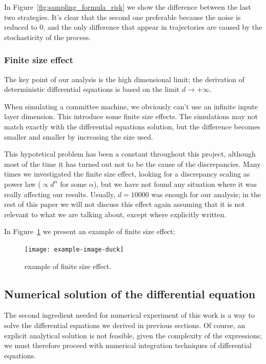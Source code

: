 In Figure~\ref{fig:sampling_formula_risk} we show the difference between the last two strategies.
It's clear that the second one preferable because the noise is reduced to 0, and the only difference
that appear in trajectories are caused by the stochasticity of the process.

\subsubsection{Finite size effect}
The key point of our analysis is the high dimensional limit; the derivation of 
deterministic differential equations is based on the limit \(d\to+\infty\).

When simulating a committee machine, we obviously can't use an infinite inpute layer dimension.
This introduce some finite size effects. The simulations may not match exactly with the 
differential equations solution, but the difference becomes smaller and smaller by 
increasing the size used. 

This hypotetical problem has been a constant throughout this project,
although most of the time it has turned out not to be the cause of the discrepancies.
Many times we investigated the finite size effect, looking for a discrepancy scaling as
power law (\(\propto d^\alpha\) for some \(\alpha\)), but we have not found any situation where
it was really affecting our results. Usually, \(d=10000\) was enough for our analysis; 
in the rest of this paper we will not discuss this effect again assuming that
it is not relevant to what we are talking about, except where explicitly written.

In Figure~\ref{fig:finite_size_example} we present an example of finite size effect;
\begin{figure}
  \begin{center}
    \texttt{[image: example-image-duck]}

    \caption{
      example of finite size effect. 
    }
    \label{fig:finite_size_example}
  \end{center}
\end{figure}

\subsection{Numerical solution of the differential equation}
The second ingredient needed for numerical experiment of this work is a way to
solve the differential equations we derived in previous sections. Of course,
an explicit analytical solution is not feasible, given the complexity of the expressions;
we must therefore proceed with numerical integration techniques of differential equations. 

